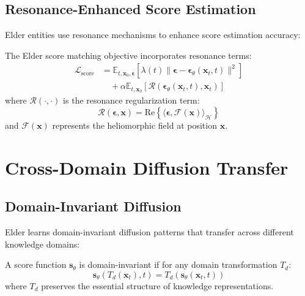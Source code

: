 \subsection{Resonance-Enhanced Score Estimation}

Elder entities use resonance mechanisms to enhance score estimation accuracy:

\begin{theorem}
The Elder score matching objective incorporates resonance terms:
\begin{align}
\mathcal{L}_{\text{score}} &= \mathbb{E}_{t,\mathbf{x}_0,\boldsymbol{\epsilon}} \left[ \lambda(t) \|\boldsymbol{\epsilon} - \boldsymbol{\epsilon}_\theta(\mathbf{x}_t, t)\|^2 \right] \\
&\quad + \alpha \mathbb{E}_{t,\mathbf{x}_0} \left[ \mathcal{R}(\boldsymbol{\epsilon}_\theta(\mathbf{x}_t, t), \mathbf{x}_t) \right]
\end{align}
where $\mathcal{R}(\cdot, \cdot)$ is the resonance regularization term:
\begin{equation}
\mathcal{R}(\boldsymbol{\epsilon}, \mathbf{x}) = \text{Re}\left\{ \langle \boldsymbol{\epsilon}, \mathcal{F}(\mathbf{x}) \rangle_{\mathcal{H}} \right\}
\end{equation}
and $\mathcal{F}(\mathbf{x})$ represents the heliomorphic field at position $\mathbf{x}$.
\end{theorem}

\section{Cross-Domain Diffusion Transfer}

\subsection{Domain-Invariant Diffusion}

Elder learns domain-invariant diffusion patterns that transfer across different knowledge domains:

\begin{definition}
A score function $\mathbf{s}_\theta$ is domain-invariant if for any domain transformation $T_d$:
\begin{equation}
\mathbf{s}_\theta(T_d(\mathbf{x}_t), t) = T_d(\mathbf{s}_\theta(\mathbf{x}_t, t))
\end{equation}
where $T_d$ preserves the essential structure of knowledge representations.
\end{definition}

